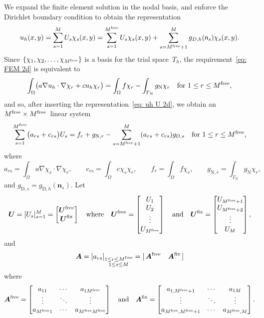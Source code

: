 We expand the finite element solution in the nodal basis, and enforce the 
Dirichlet boundary condition to obtain the representation
\begin{equation}\label{eq: uh U 2d}
u_h(x,y)=\sum_{s=1}^MU_s\chi_s(x,y)=\sum_{s=1}^{M^{\mathrm{free}}}U_s\chi_s(x,y)
    +\sum_{s=M^{\mathrm{free}}+1}^M g_{D,h}(\mathsf{n}_s)\chi_s(x,y).
\end{equation}
Since $\{\chi_1,\chi_2,\ldots,\chi_{M^{\mathrm{free}}}\}$ is a basis for the trial 
space~$T_h$, the requirement~\eqref{eq: FEM 2d} is equivalent to
\begin{equation}\label{eq: FEM 2d alt}
\int_\Omega\bigl(a\nabla u_h\cdot\nabla\chi_r+cu_h\chi_r\bigr)
    =\int_\Omega f\chi_r
    -\int_{\Gamma_{\mathrm{N}}}g_{\mathrm{N}}\chi_r
    \quad\text{for $1\le r\le M^{\mathrm{free}}$,}
\end{equation}
and so, after inserting the representation~\eqref{eq: uh U 2d}, we obtain an 
$M^{\mathrm{free}}\times M^{\mathrm{free}}$~linear system
\begin{equation}\label{eq: FEM 2D linear system}
\sum_{s=1}^{M^{\mathrm{free}}}\bigl(a_{rs}+c_{rs}\bigr)U_s
    =f_r+g_{\mathrm{N},r}-\sum_{s=M^{\mathrm{free}}+1}^M(a_{rs}+c_{rs})g_{\mathrm{D},s}
    \quad\text{for $1\le r\le M^{\mathrm{free}}$,}
\end{equation}
where
\[
a_{rs}=\int_\Omega a\nabla\chi_s\cdot\nabla\chi_r,\qquad
c_{rs}=\int_\Omega c\chi_s\chi_r,\qquad
f_r=\int_\Omega f\chi_r,\qquad
g_{\mathrm{N},r}=\int_{\Gamma_{\mathrm{N}}}g_{\mathrm{N}}\chi_r,
\]
and $g_{\mathrm{D},s}=g_{\mathrm{D},h}(\boldsymbol{n}_s)$. Let 
\[
\boldsymbol{U}=[U_s]_{s=1}^M
    =\begin{bmatrix}\boldsymbol{U}^{\mathrm{free}}\\ \boldsymbol{U}^{\mathrm{fix}} \end{bmatrix}
\quad\text{where}\quad
\boldsymbol{U}^{\mathrm{free}}=\begin{bmatrix}U_1\\ U_2\\ \vdots\\ U_{M^{\mathrm{free}}}\end{bmatrix}
\quad\text{and}\quad
\boldsymbol{U}^{\mathrm{fix}}=\begin{bmatrix}U_{M^{\mathrm{free}}+1}\\ U_{M^{\mathrm{free}}+2}\\ \vdots\\ U_M
\end{bmatrix},
\]
and 
\[
\boldsymbol{A}=[a_{rs}]_{\substack{1\le r\le M^{\mathrm{free}}\\ 1\le s\le M}}
=[\,\boldsymbol{A}^{\mathrm{free}}\quad\boldsymbol{A}^{\mathrm{fix}}\,]
\]
where
\[
\boldsymbol{A}^{\mathrm{free}}=\begin{bmatrix}
a_{11}&\cdots&a_{1M^{\mathrm{free}}}\\
\vdots&\ddots&\vdots\\
a_{M^{\mathrm{free}}1}&\cdots&a_{M^{\mathrm{free}} M^{\mathrm{free}}}
\end{bmatrix}
\quad\text{and}\quad
\boldsymbol{A}^{\mathrm{fix}}=\begin{bmatrix}
a_{1,M^{\mathrm{free}}+1}&\cdots&a_{1M}\\
\vdots&\ddots&\vdots\\
a_{M^{\mathrm{free}},M^{\mathrm{free}}+1}&\cdots&a_{M^{\mathrm{free}},M}
\end{bmatrix}.
\]
